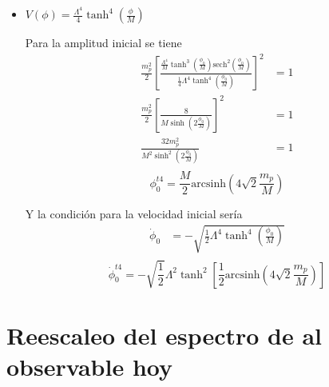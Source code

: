 \begin{itemize}
    \item $\displaystyle V(\phi) = \frac{\Lambda^4}{4} \tanh^4 \left( \frac{\phi}{M} \right)$
    
    Para la amplitud inicial se tiene
    \begin{equation*}
        \begin{split}
            \frac{m_p^2}{2} \left[ \frac{\frac{\Lambda^4}{M} \tanh^3 \left( \frac{\phi_0}{M} \right) \text{sech}^2 \left( \frac{\phi_0}{M} \right)}{\frac{1}{4} \Lambda^4 \tanh^4 \left( \frac{\phi_0}{M} \right)} \right]^2 &= 1\\
            \frac{m_p^2}{2} \left[ \frac{8}{M \sinh \left( 2 \frac{\phi_0}{M} \right)} \right]^2 &= 1\\
            \frac{32 m_p^2}{M^2 \sinh^2 \left( 2 \frac{\phi_0}{M} \right)} &= 1\\
        \end{split}
    \end{equation*}
    \begin{equation}
        \phi_0^{t4} = \frac{M}{2} \text{arcsinh} \left( 4 \sqrt{2} \frac{m_p}{M} \right)
    \end{equation}

    Y la condición para la velocidad inicial sería
    \begin{equation*}
        \begin{split}
            \dot{\phi}_0 &= -\sqrt{\frac{1}{2} \Lambda^4 \tanh^4 \left( \frac{\phi_0}{M} \right)}\\
        \end{split}
    \end{equation*}
    \begin{equation}
        \dot{\phi}_0^{t4} = - \sqrt{\frac{1}{2}} \Lambda^2 \tanh^2 \left[ \frac{1}{2} \text{arcsinh} \left( 4 \sqrt{2} \frac{m_p}{M} \right) \right]
    \end{equation}
\end{itemize}

\newpage



\chapter{Reescaleo del espectro de \CosmoLattice al observable hoy} \label{sec:apexC}

